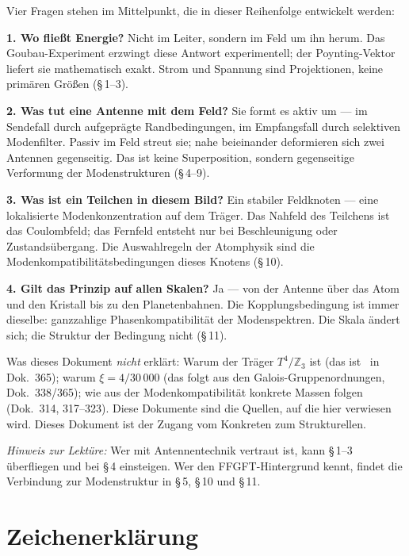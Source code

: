 Vier Fragen stehen im Mittelpunkt, die in dieser Reihenfolge entwickelt werden:

\textbf{1. Wo fließt Energie?} Nicht im Leiter, sondern im Feld um ihn herum.
Das Goubau-Experiment erzwingt diese Antwort experimentell; der Poynting-Vektor
liefert sie mathematisch exakt. Strom und Spannung sind Projektionen, keine
primären Größen (§\,1--3).

\textbf{2. Was tut eine Antenne mit dem Feld?} Sie formt es aktiv um ---
im Sendefall durch aufgeprägte Randbedingungen, im Empfangsfall durch
selektiven Modenfilter. Passiv im Feld streut sie; nahe beieinander
deformieren sich zwei Antennen gegenseitig. Das ist keine Superposition,
sondern gegenseitige Verformung der Modenstrukturen (§\,4--9).

\textbf{3. Was ist ein Teilchen in diesem Bild?} Ein stabiler Feldknoten ---
eine lokalisierte Modenkonzentration auf dem Träger. Das Nahfeld des
Teilchens ist das Coulombfeld; das Fernfeld entsteht nur bei Beschleunigung
oder Zustandsübergang. Die Auswahlregeln der Atomphysik sind die
Mo\-den\-kom\-pa\-ti\-bi\-li\-täts\-be\-din\-gun\-gen dieses Knotens (§\,10).

\textbf{4. Gilt das Prinzip auf allen Skalen?} Ja --- von der Antenne über
das Atom und den Kristall bis zu den Planetenbahnen. Die Kopplungsbedingung
ist immer dieselbe: ganzzahlige Phasenkompatibilität der Modenspektren.
Die Skala ändert sich; die Struktur der Bedingung nicht (§\,11).

Was dieses Dokument \emph{nicht} erklärt: Warum der Träger $T^4/\mathbb{Z}_3$
ist (das ist \SetzM\ in Dok.~365); warum $\xi = 4/30\,000$ (das folgt aus
den Galois-Gruppenordnungen, Dok.~338/365); wie aus der Modenkompatibilität
konkrete Massen folgen (Dok.~314, 317--323). Diese Dokumente sind die
Quellen, auf die hier verwiesen wird. Dieses Dokument ist der Zugang vom
Konkreten zum Strukturellen.

\vspace{0.5em}
\noindent
\textit{Hinweis zur Lektüre:} Wer mit Antennentechnik vertraut ist, kann
§\,1--3 überfliegen und bei §\,4 einsteigen. Wer den FFGFT-Hintergrund kennt,
findet die Verbindung zur Modenstruktur in §\,5, §\,10 und §\,11.

\section*{Zeichenerklärung}

